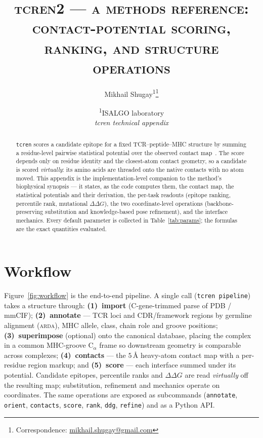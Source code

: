 \documentclass[11pt]{article}
\title{\scshape tcren2 --- a methods reference:\\ contact-potential scoring, ranking, and structure operations}
\author{Mikhail Shugay\textsuperscript{1}\thanks{Correspondence:
  \href{mailto:mikhail.shugay@gmail.com}{mikhail.shugay@gmail.com}}}
\date{%
  \small
  \textsuperscript{1}ISALGO laboratory\\[6pt]
  \normalsize\textit{tcren technical appendix}%
}
\theoremstyle{oldplain}
\theoremstyle{oldrem}
\begin{document}
\maketitle

\begin{abstract}
\texttt{tcren} scores a candidate epitope for a fixed TCR--peptide--MHC structure by summing a
residue-level pairwise statistical potential over the observed contact map~\cite{Karnaukhov2024}. The
score depends only on residue identity and the closest-atom contact geometry, so a candidate is scored
\emph{virtually}: its amino acids are threaded onto the native contacts with no atom moved. This
appendix is the implementation-level companion to the method's biophysical synopsis --- it states, as
the code computes them, the contact map, the statistical potentials and their derivation, the per-task
readouts (epitope ranking, percentile rank, mutational $\Delta\Delta G$), the two coordinate-level
operations (backbone-preserving substitution and knowledge-based pose refinement), and the interface
mechanics. Every default parameter is collected in Table~\ref{tab:params}; the formulas are the exact
quantities evaluated.
\end{abstract}

\section{Workflow}\label{sec:workflow}
Figure~\ref{fig:workflow} is the end-to-end pipeline. A single call (\texttt{tcren pipeline}) takes a
structure through: \textbf{(1)~import} (C-gene-trimmed parse of PDB / mmCIF); \textbf{(2)~annotate} ---
TCR loci and CDR/framework regions by germline alignment (\textsc{arda}), MHC allele, class, chain role
and groove positions; \textbf{(3)~superimpose} (optional) onto the canonical database, placing the
complex in a common MHC-groove $\mathrm C_\alpha$ frame so downstream geometry is comparable across
complexes; \textbf{(4)~contacts} --- the $5\,\text{\AA}$ heavy-atom contact map with a per-residue
region markup; and \textbf{(5)~score} --- each interface summed under its potential. Candidate epitopes,
percentile ranks and $\Delta\Delta G$ are read \emph{virtually} off the resulting map; substitution,
refinement and mechanics operate on coordinates. The same operations are exposed as subcommands
(\texttt{annotate}, \texttt{orient}, \texttt{contacts}, \texttt{score}, \texttt{rank}, \texttt{ddg},
\texttt{refine}) and as a Python API.
\end{document}
